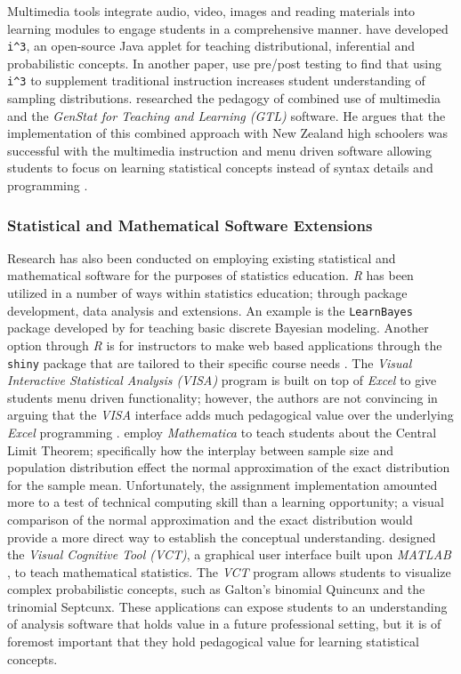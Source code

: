 Multimedia tools integrate audio, video, images and reading materials into learning modules to engage students in a comprehensive manner. \citet{McDanielGreen2012Paper1} have developed \texttt{i\string^3}, an open-source Java applet for teaching distributional, inferential and probabilistic concepts.  In another paper, \citet{McDanielGreen2012Paper2} use pre/post testing to find that using \texttt{i\string^3} to supplement traditional instruction increases student understanding of sampling distributions. \citet{Harraway2012} researched the pedagogy of combined use of multimedia and the \textit{GenStat for Teaching and Learning (GTL)} software. He argues that the implementation of this combined approach with New Zealand high schoolers was successful with the multimedia instruction and menu driven software allowing students to focus on learning statistical concepts instead of syntax details and programming .

\subsubsection{Statistical and Mathematical Software Extensions} 

Research has also been conducted on employing existing statistical and mathematical software for the purposes of statistics education. \textit{R} has been utilized in a number of ways within statistics education; through package development, data analysis and extensions. An example is the \texttt{LearnBayes} package \citep{LearnBayes} developed by \citet{Albert2009} for teaching basic discrete Bayesian modeling. Another option through \textit{R} is for instructors to make web based applications through the \texttt{shiny} package that are tailored to their specific course needs \citep{shiny}. The \textit{Visual Interactive Statistical Analysis (VISA)} program is built on top of \textit{Excel} \citep{Excel} to give students menu driven functionality; however, the authors are not convincing in arguing that the \textit{VISA} interface adds much pedagogical value over the underlying \textit{Excel} programming \citep{Shaltayev2010}. \citet{Hoff2012} employ \textit{Mathematica} \citep{Mathematica} to teach students about the  Central Limit Theorem; specifically how the interplay between sample size and population distribution effect the normal approximation of the exact distribution for the sample mean. Unfortunately, the assignment implementation amounted more to a test of technical computing skill than a learning opportunity; a visual comparison of the normal approximation and the exact distribution would provide a more direct way to establish the conceptual understanding.  \citep{Harlow2009} designed the \textit{Visual Cognitive Tool (VCT)}, a graphical user interface built upon \textit{MATLAB} \citep{MATLAB}, to teach mathematical statistics.  The \textit{VCT} program allows students to visualize complex probabilistic concepts, such as Galton's binomial Quincunx and the trinomial Septcunx. These applications can expose students to an understanding of analysis software that holds value in a future professional setting, but it is of foremost important that they hold pedagogical value for learning statistical concepts.


